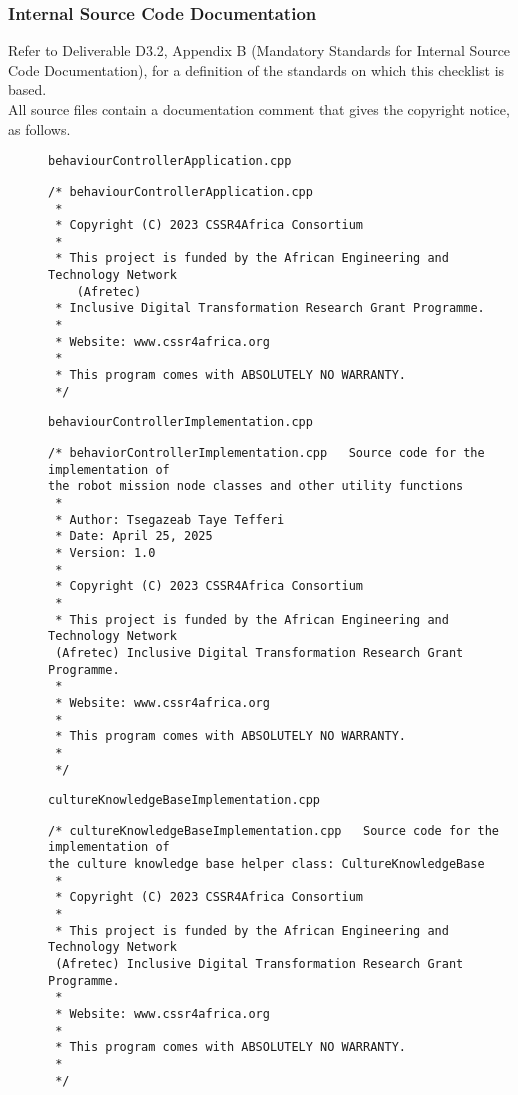 \documentclass{CSSRforAfrica}
\newcommand{\checkboxChecked}{\fbox{\ding{51}}} %
\begin{document}
 
\subsubsection{Internal Source Code Documentation}
\label{subsubsection:behaviour_controller_documentation_standards}  
 
Refer to Deliverable D3.2, Appendix B (Mandatory Standards for Internal Source Code Documentation), for a definition of the standards on which this checklist is based.\\

\noindent All source files contain a documentation comment that gives the copyright notice, as follows.
 
\begin{description}

\item[\checkboxChecked] {\small \verb+behaviourControllerApplication.cpp+}  
{\small \begin{verbatim}
/* behaviourControllerApplication.cpp
 *
 * Copyright (C) 2023 CSSR4Africa Consortium
 * 
 * This project is funded by the African Engineering and Technology Network 
    (Afretec) 
 * Inclusive Digital Transformation Research Grant Programme. 
 *
 * Website: www.cssr4africa.org
 *
 * This program comes with ABSOLUTELY NO WARRANTY.
 */
\end{verbatim} }

\item[\checkboxChecked]  {\small \verb+behaviourControllerImplementation.cpp+}  
{\small \begin{verbatim}
/* behaviorControllerImplementation.cpp   Source code for the implementation of 
the robot mission node classes and other utility functions
 *
 * Author: Tsegazeab Taye Tefferi
 * Date: April 25, 2025
 * Version: 1.0
 *
 * Copyright (C) 2023 CSSR4Africa Consortium
 *
 * This project is funded by the African Engineering and Technology Network 
 (Afretec) Inclusive Digital Transformation Research Grant Programme.
 *
 * Website: www.cssr4africa.org
 *
 * This program comes with ABSOLUTELY NO WARRANTY.
 *
 */
\end{verbatim} }

\item[\checkboxChecked]  {\small \verb+cultureKnowledgeBaseImplementation.cpp+}  
{\small \begin{verbatim}
/* cultureKnowledgeBaseImplementation.cpp   Source code for the implementation of 
the culture knowledge base helper class: CultureKnowledgeBase
 *
 * Copyright (C) 2023 CSSR4Africa Consortium
 *
 * This project is funded by the African Engineering and Technology Network 
 (Afretec) Inclusive Digital Transformation Research Grant Programme.
 *
 * Website: www.cssr4africa.org
 *
 * This program comes with ABSOLUTELY NO WARRANTY.
 *
 */


\end{verbatim}}
\end{description}
\end{document}
